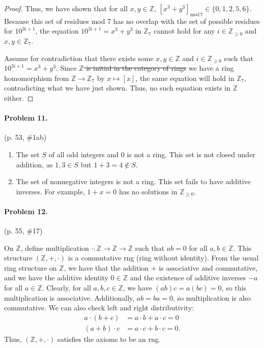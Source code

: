 \documentclass[12pt]{article}
\begin{document}
\begin{proof}
Thus, we have shown that for all $x, y \in \mathbb Z$, $[x^3 + y^3]_{\mathrm{mod }\,7} \in \{0, 1, 2, 5, 6\}$. Because this set of residues mod 7 has no overlap with the set of possible residues for $10^{3i+1}$, the equation $10^{3i+1} = x^3 + y^3$ in $\mathbb Z_7$ cannot hold for any $i \in \mathbb Z_{\ge 0}$ and $x, y \in \mathbb Z_7$. 

Assume for contradiction that there exists some $x, y \in \mathbb Z$ and $i \in \mathbb Z_{\ge 0}$ such that $10^{3i+1} = x^3 + y^3$. Since \st{$\mathbb Z$ is initial in the category of rings} we have a ring homomorphism from $\mathbb Z \to \mathbb Z_7$ by $x \mapsto [x]$, the same equation will hold in $\mathbb Z_7$, contradicting what we have just shown. Thus, no such equation exists in $\mathbb Z$ either.
\end{proof}
\newpage{}
\paragraph{Problem 11.} (p. 53, \#1ab)

\begin{enumerate}
    \item[a] The set $S$ of all odd integers and $0$ is not a ring. This set is not closed under addition, as $1, 3 \in S$ but $1+3 = 4 \not\in S$.
    \item[b] The set of nonnegative integers is not a ring. This set fails to have additive inverses. For example, $1 + x = 0$ has no solutions in $\mathbb Z_{\ge 0}$.
\end{enumerate}

\paragraph{Problem 12.} (p. 55, \#17)

On $\mathbb Z$, define multiplication $\cdot : \mathbb Z \to \mathbb Z \to \mathbb Z$ such that $ab = 0$ for all $a,b \in \mathbb Z$. This structure $(\mathbb Z, +, \cdot)$ is a commutative rng (ring without identity). From the usual ring structure on $\mathbb Z$, we have that the addition $+$ is associative and commutative, and we have the additive identity $0 \in \mathbb Z$ and the existence of additive inverses $-a$ for all $a \in \mathbb Z$. Clearly, for all $a,b,c \in \mathbb Z$, we have $(ab)c = a(bc) = 0$, so this multiplication is associative. Additionally, $ab = ba = 0$, so multiplication is also commutative. We can also check left and right distributivity:
\begin{align*}a\cdot (b + c) &= a\cdot b + a \cdot c = 0 \\ (a + b) \cdot c &= a \cdot c + b \cdot c = 0.\end{align*}
Thus, $(\mathbb Z, +, \cdot)$ satisfies the axioms to be an rng.
\end{document}
